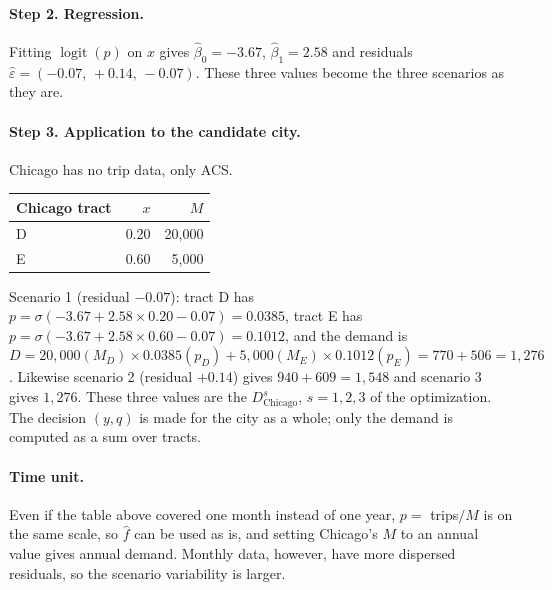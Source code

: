 \documentclass[10pt,a4paper]{article}
\DeclareMathOperator{\logit}{logit}
\begin{document}
\paragraph{Step 2. Regression.} Fitting $\logit(p)$ on $x$ gives $\hat\beta_0=-3.67$, $\hat\beta_1=2.58$ and residuals $\hat\varepsilon=(-0.07,\,+0.14,\,-0.07)$. These three values become the three scenarios as they are.

\paragraph{Step 3. Application to the candidate city.} Chicago has no trip data, only ACS.
\begin{table}[H]\centering\small
\begin{tabular}{@{}lrr@{}}
\toprule
Chicago tract & $x$ & $M$ \\ \midrule
D & 0.20 & 20{,}000 \\
E & 0.60 & 5{,}000 \\
\bottomrule
\end{tabular}
\end{table}
Scenario 1 (residual $-0.07$): tract D has $p=\sigma(-3.67+2.58\times0.20-0.07)=0.0385$, tract E has $p=\sigma(-3.67+2.58\times0.60-0.07)=0.1012$, and the demand is $D=20{,}000(M_D)\times0.0385(p_D)+5{,}000(M_E)\times0.1012(p_E)=770+506=1{,}276$. Likewise scenario 2 (residual $+0.14$) gives $940+609=1{,}548$ and scenario 3 gives $1{,}276$. These three values are the $D_{\text{Chicago}}^{s}$, $s=1,2,3$ of the optimization. The decision $(y,q)$ is made for the city as a whole; only the demand is computed as a sum over tracts.


\paragraph{Time unit.} Even if the table above covered one month instead of one year, $p=$ trips$/M$ is on the same scale, so $\hat f$ can be used as is, and setting Chicago's $M$ to an annual value gives annual demand. Monthly data, however, have more dispersed residuals, so the scenario variability is larger.

\end{document}
